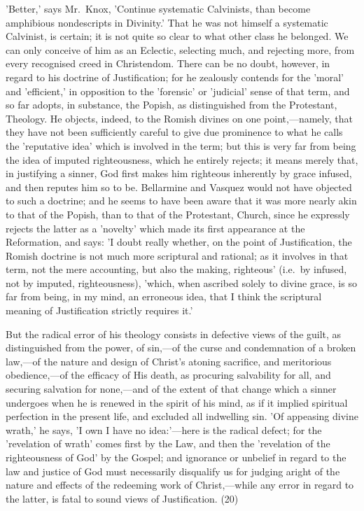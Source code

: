 \documentclass[
]{book}
\begin{document}
'Better,' says Mr.~Knox, 'Continue systematic Calvinists, than become amphibious nondescripts in Divinity.' That he was not himself a systematic Calvinist, is certain; it is not quite so clear to what other class he belonged. We can only conceive of him as an Eclectic, selecting much, and rejecting more, from every recognised creed in Christendom. There can be no doubt, however, in regard to his doctrine of Justification; for he zealously contends for the 'moral' and 'efficient,' in opposition to the 'forensic' or 'judicial' sense of that term, and so far adopts, in substance, the Popish, as distinguished from the Protestant, Theology. He objects, indeed, to the Romish divines on one point,---namely, that they have not been sufficiently careful to give due prominence to what he calls the 'reputative idea' which is involved in the term; but this is very far from being the idea of imputed righteousness, which he entirely rejects; it means merely that, in justifying a sinner, God first makes him righteous inherently by grace infused, and then reputes him so to be. Bellarmine and Vasquez would not have objected to such a doctrine; and he seems to have been aware that it was more nearly akin to that of the Popish, than to that of the Protestant, Church, since he expressly rejects the latter as a 'novelty' which made its first appearance at the Reformation, and says: 'I doubt really whether, on the point of Justification, the Romish doctrine is not much more scriptural and rational; as it involves in that term, not the mere accounting, but also the making, righteous' (i.e.~by infused, not by imputed, righteousness), 'which, when ascribed solely to divine grace, is so far from being, in my mind, an erroneous idea, that I think the scriptural meaning of Justification strictly requires it.'

But the radical error of his theology consists in defective views of the guilt, as distinguished from the power, of sin,---of the curse and condemnation of a broken law,---of the nature and design of Christ's atoning sacrifice, and meritorious obedience,---of the efficacy of His death, as procuring salvability for all, and securing salvation for none,---and of the extent of that change which a sinner undergoes when he is renewed in the spirit of his mind, as if it implied spiritual perfection in the present life, and excluded all indwelling sin. 'Of appeasing divine wrath,' he says, 'I own I have no idea:'---here is the radical defect; for the 'revelation of wrath' comes first by the Law, and then the 'revelation of the righteousness of God' by the Gospel; and ignorance or unbelief in regard to the law and justice of God must necessarily disqualify us for judging aright of the nature and effects of the redeeming work of Christ,---while any error in regard to the latter, is fatal to sound views of Justification. (20)
\end{document}
